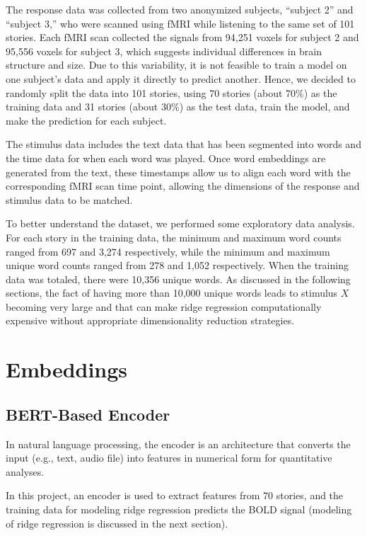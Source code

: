 \documentclass[12pt,letterpaper]{article}
\begin{document}
The response data was collected from two anonymized subjects, “subject 2” and “subject 3,” who were scanned using fMRI while listening to the same set of 101 stories. Each fMRI scan collected the signals from 94,251 voxels for subject 2 and 95,556 voxels for subject 3, which suggests individual differences in brain structure and size. Due to this variability, it is not feasible to train a model on one subject's data and apply it directly to predict another. Hence, we decided to randomly split the data into 101 stories, using 70 stories (about 70\%) as the training data and 31 stories (about 30\%) as the test data, train the model, and make the prediction for each subject. 


The stimulus data includes the text data that has been segmented into words and the time data for when each word was played. Once word embeddings are generated from the text, these timestamps allow us to align each word with the corresponding fMRI scan time point, allowing the dimensions of the response and stimulus data to be matched.

To better understand the dataset, we performed some exploratory data analysis. For each story in the training data, the minimum and maximum word counts ranged from 697 and 3,274 respectively, while the minimum and maximum unique word counts ranged from 278 and 1,052 respectively. When the training data was totaled, there were 10,356 unique words. As discussed in the following sections, the fact of having more than 10,000 unique words leads to stimulus $X$ becoming very large and that can make ridge regression computationally expensive without appropriate dimensionality reduction strategies.


\section{Embeddings}

\subsection{BERT-Based Encoder}

In natural language processing, the encoder is an architecture that converts the input (e.g., text, audio file) into features in numerical form for quantitative analyses.

In this project, an encoder is used to extract features from 70 stories, and the training data for modeling ridge regression predicts the BOLD signal (modeling of ridge regression is discussed in the next section).
\end{document}
